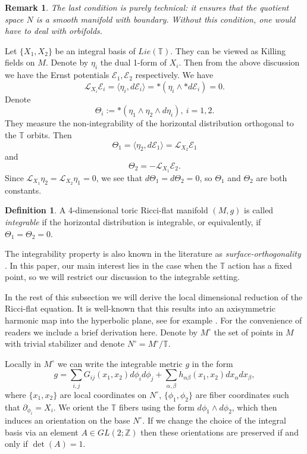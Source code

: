 \documentclass[a4paper,11pt]{amsart}
\newtheorem{remark}[theorem]{Remark}
\theoremstyle{definition}
\newtheorem{definition}[theorem]{Definition}
\numberwithin{equation}{section}
\newcommand{\p}{\partial}
\newcommand{\dT}{\mathbb{T}}
\newcommand{\dZ}{\mathbb{Z}}
\begin{document}
 \begin{remark}
 The last condition is purely technical: it ensures that the quotient space $N$ is a smooth manifold with boundary. Without this condition, one would have to deal with orbifolds. 	
 \end{remark}

 
Let $\{X_1, X_2\}$ be an integral basis of $Lie(\dT)$. They can be viewed as Killing fields on $M$. Denote by $\eta_i$ the dual 1-form of $X_i$.  Then from the above discussion we have the Ernst potentials $\mathcal{E}_1, \mathcal{E}_2$ respectively.  We have 
$$\mathcal L_{X_i}\mathcal{E}_i=\langle \eta_i, d\mathcal{E}_i\rangle=*(\eta_i\wedge *d\mathcal{E}_i)=0.$$ 
Denote $$\Theta_i:=*(\eta_1\wedge\eta_2\wedge d\eta_i),\ i=1, 2.$$  They measure the non-integrability of the horizontal distribution orthogonal to the $\mathbb T$ orbits. Then 
$$\Theta_1=\langle\eta_2, d\mathcal{E}_1\rangle=\mathcal L_{X_2}\mathcal{E}_1$$ 
and 
$$\Theta_2=-\mathcal L_{X_1}\mathcal{E}_2.$$
Since $\mathcal L_{X_1}\eta_2=\mathcal L_{X_2}\eta_1=0$, we see that $d\Theta_1=d\Theta_2=0$, so $\Theta_1$ and $\Theta_2$ are both constants. 
 
\begin{definition}
	A 4-dimensional toric Ricci-flat manifold $(M, g)$ is called \emph{integrable} if the horizontal distribution is integrable, or equivalently, if $\Theta_1=\Theta_2=0$.
\end{definition}
The integrability property is also known in the literature as \emph{surface-orthogonality} \cite{Calderbank2002,Joyce1995}. In this paper, our main interest lies in the case when the $\mathbb T$ action has a fixed point,  so we will restrict our discussion to the integrable setting.


In the rest of this subsection we will derive the local dimensional reduction of the Ricci-flat equation. It is well-known that this results into an axisymmetric harmonic map into the hyperbolic plane, see for example  \cite{Lott, Kunduri}. For the convenience of readers we include a brief derivation here.  Denote by $M^\circ$ the set of points in $M$ with trivial stabilizer and denote $N^\circ=M^\circ/\dT$.

Locally in $M^\circ$ we can write the integrable metric $g$ in the form 
\begin{equation} \label{eqn-local form for T2 invariant metric}
	g=\sum_{i,j}G_{ij}(x_1, x_2)d\phi_id\phi_j+\sum_{\alpha, \beta}h_{\alpha\beta}(x_1, x_2)dx_\alpha dx_\beta,
\end{equation}
where $\{x_1, x_2\}$ are local coordinates on $N^\circ$, $\{\phi_1, \phi_2\}$ are fiber coordinates such that $\p_{\phi_i}=X_i$. We orient the $\dT$ fibers using the form $d\phi_1\wedge d\phi_2$, which then induces an orientation on the base $N^\circ$. If we change the choice of the integral basis via an element $A\in GL(2; \dZ)$ then these orientations are preserved if and only if $\det(A)=1$.
\end{document}
